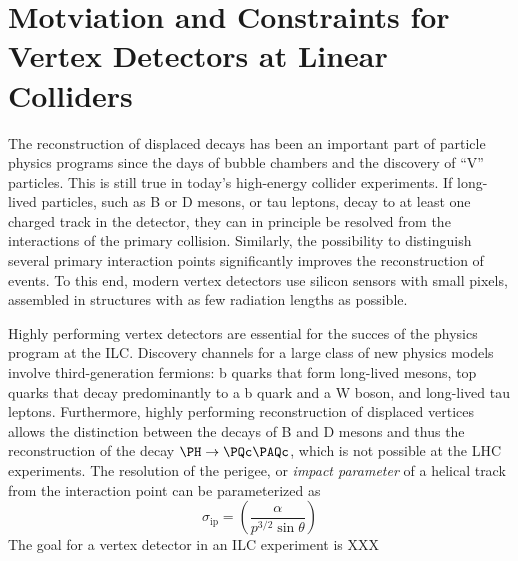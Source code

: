 \section{Motviation and Constraints for Vertex Detectors at Linear Colliders}

The reconstruction of displaced decays has been an important part of particle physics programs since the days of bubble chambers and the discovery of ``V'' particles. This is still true in today's high-energy collider experiments. If long-lived particles, such as B or D mesons, or tau leptons, decay to at least one charged track in the detector, they can in principle be resolved from the interactions of the primary collision. Similarly, the possibility to distinguish several primary interaction points significantly improves the reconstruction of events. To this end, modern vertex detectors use silicon sensors with small pixels, assembled in structures with as few radiation lengths as possible.

Highly performing vertex detectors are essential for the succes of the physics program at the ILC. Discovery channels for a large class of new physics models involve third-generation fermions: b quarks that form long-lived mesons, top quarks that decay predominantly to a b quark and a W boson, and long-lived tau leptons. Furthermore, highly performing reconstruction of displaced vertices allows the distinction between the decays of B and D mesons and thus the reconstruction of the decay $\PH\to\PQc\PAQc$, which is not possible at the LHC experiments. The resolution of the perigee, or \emph{impact parameter} of a helical track from the interaction point can be parameterized as
\begin{equation}
	\sigma_\text{ip} = \left(\frac{\alpha}{p^{3/2}\sin\theta}\right)
\end{equation}
The goal for a vertex detector in an ILC experiment is XXX
